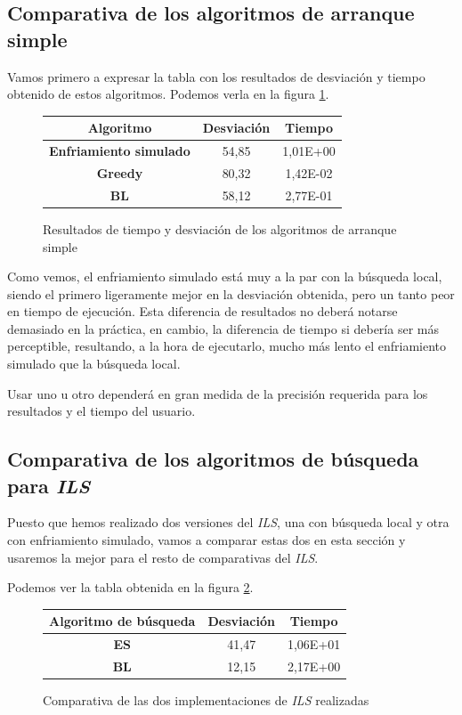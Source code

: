 \subsection{Comparativa de los algoritmos de arranque simple}

Vamos primero a expresar la tabla con los resultados de desviación y tiempo obtenido de estos algoritmos. Podemos verla en la figura \ref{tab:compSimple}.

\begin{figure}[H]
    \centering
    \begin{tabular}{|c|c|c|}
        \hline
        Algoritmo & \textbf{Desviación} & \textbf{Tiempo}\\
        \hline
        \textbf{Enfriamiento simulado} & 54,85 & 1,01E+00\\
        \hline
        \textbf{Greedy} & 80,32 & 1,42E-02\\
        \hline
        \textbf{BL} & 58,12 & 2,77E-01\\
        \hline
    \end{tabular}
    \caption{Resultados de tiempo y desviación de los algoritmos de arranque simple}
    \label{tab:compSimple}
\end{figure}

Como vemos, el enfriamiento simulado está muy a la par con la búsqueda local, siendo el primero ligeramente mejor en la desviación obtenida, pero un tanto peor en tiempo de ejecución.
Esta diferencia de resultados no deberá notarse demasiado en la práctica, en cambio, la diferencia de tiempo si debería ser más perceptible, resultando, a la hora de ejecutarlo, mucho más lento el enfriamiento simulado que la búsqueda local.

Usar uno u otro dependerá en gran medida de la precisión requerida para los resultados y el tiempo del usuario.

\subsection{Comparativa de los algoritmos de búsqueda para \textit{ILS}}

Puesto que hemos realizado dos versiones del \textit{ILS}, una con búsqueda local y otra con enfriamiento simulado, vamos a comparar estas dos en esta sección y usaremos la mejor para el resto de comparativas del \textit{ILS}.

Podemos ver la tabla obtenida en la figura \ref{tab:compILS}.

\begin{figure}[H]
    \centering
    \begin{tabular}{|c|c|c|}
        \hline
        Algoritmo de búsqueda & \textbf{Desviación} & \textbf{Tiempo}\\
        \hline
        \textbf{ES} & 41,47 & 1,06E+01\\
        \hline
        \textbf{BL} & 12,15 & 2,17E+00\\
        \hline
    \end{tabular}
    \caption{Comparativa de las dos implementaciones de \textit{ILS} realizadas}
    \label{tab:compILS}
\end{figure}

